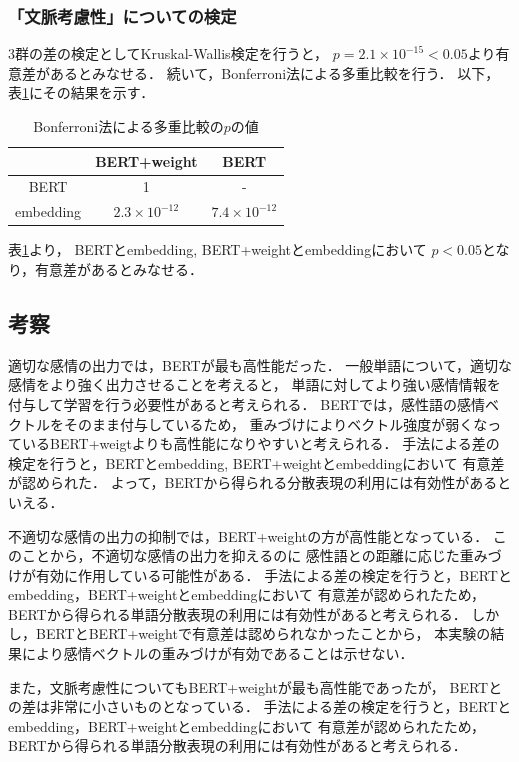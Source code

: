 	\subsubsection{「文脈考慮性」についての検定}
		3群の差の検定としてKruskal-Wallis検定を行うと，
		$p=2.1\times10^{-15}<0.05$より有意差があるとみなせる．
		続いて，Bonferroni法による多重比較を行う．
		以下，表\ref{table:jikken2_context_Bonferroni}にその結果を示す．
		\begin{table}[H]
			\centering
			\caption{Bonferroni法による多重比較の$p$の値}
			\label{table:jikken2_context_Bonferroni}
			\begin{tabular}{|c|c|c|}
				\hline
				& BERT+weight & BERT \\
				\hline
				BERT & 1 & - \\
				\hline
				embedding & $2.3\times10^{-12}$ & $7.4\times10^{-12}$ \\
				\hline
			\end{tabular}
		\end{table}
		表\ref{table:jikken2_context_Bonferroni}より，
		BERTとembedding, BERT+weightとembeddingにおいて
		$p<0.05$となり，有意差があるとみなせる．

	\subsection{考察}
		適切な感情の出力では，BERTが最も高性能だった．
		一般単語について，適切な感情をより強く出力させることを考えると，
		単語に対してより強い感情情報を付与して学習を行う必要性があると考えられる．
		BERTでは，感性語の感情ベクトルをそのまま付与しているため，
		重みづけによりベクトル強度が弱くなっているBERT+weigtよりも高性能になりやすいと考えられる．
		手法による差の検定を行うと，BERTとembedding, BERT+weightとembeddingにおいて
		有意差が認められた．
		よって，BERTから得られる分散表現の利用には有効性があるといえる．

		不適切な感情の出力の抑制では，BERT+weightの方が高性能となっている．
		このことから，不適切な感情の出力を抑えるのに
		感性語との距離に応じた重みづけが有効に作用している可能性がある．
		手法による差の検定を行うと，BERTとembedding，BERT+weightとembeddingにおいて
		有意差が認められたため，BERTから得られる単語分散表現の利用には有効性があると考えられる．
		しかし，BERTとBERT+weightで有意差は認められなかったことから，
		本実験の結果により感情ベクトルの重みづけが有効であることは示せない．

		また，文脈考慮性についてもBERT+weightが最も高性能であったが，
		BERTとの差は非常に小さいものとなっている．
		手法による差の検定を行うと，BERTとembedding，BERT+weightとembeddingにおいて
		有意差が認められたため，BERTから得られる単語分散表現の利用には有効性があると考えられる．
		
